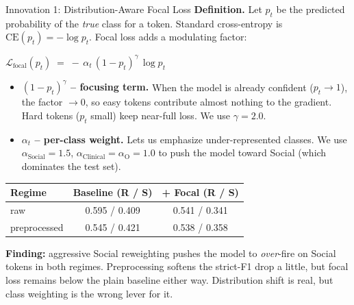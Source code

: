 \documentclass[aspectratio=169,10pt]{beamer}
\begin{document}
\begin{frame}{Innovation 1: Distribution-Aware Focal Loss}
  \textbf{Definition.} Let $p_t$ be the predicted probability of the \emph{true} class for a token.
  Standard cross-entropy is $\text{CE}(p_t) = -\log p_t$. Focal loss adds a modulating factor:
  \smallskip

  \begin{center}
  $\displaystyle \mathcal{L}_{\text{focal}}(p_t) \;=\; -\,\alpha_t \, (1 - p_t)^{\gamma}\,\log p_t$
  \end{center}
  \smallskip

  \footnotesize
  \begin{itemize}\setlength{\itemsep}{0pt}
    \item \textbf{$(1 - p_t)^{\gamma}$ -- focusing term.} When the model is already confident ($p_t \to 1$), the factor $\to 0$, so easy tokens contribute almost nothing to the gradient. Hard tokens ($p_t$ small) keep near-full loss. We use $\gamma = 2.0$.
    \item \textbf{$\alpha_t$ -- per-class weight.} Lets us emphasize under-represented classes. We use $\alpha_{\text{Social}} = 1.5$, $\alpha_{\text{Clinical}} = \alpha_{\text{O}} = 1.0$ to push the model toward Social (which dominates the test set).
  \end{itemize}
  \smallskip

  \begin{center}\scriptsize
  \begin{tabular}{lcc}
    \toprule
    Regime & Baseline (R / S) & + Focal (R / S) \\
    \midrule
    raw & 0.595 / 0.409 & 0.541 / 0.341 \\
    preprocessed & 0.545 / 0.421 & 0.538 / 0.358 \\
    \bottomrule
  \end{tabular}
  \end{center}

  \footnotesize \textbf{Finding:} aggressive Social reweighting pushes the model to \emph{over}-fire on Social tokens in both regimes. Preprocessing softens the strict-F1 drop a little, but focal loss remains below the plain baseline either way. \textcolor{neutral}{Distribution shift is real, but class weighting is the wrong lever for it.}
\end{frame}
\end{document}
